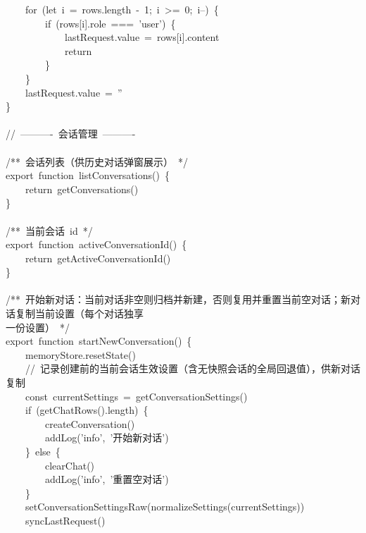 \documentclass[a4paper,10pt]{article}
\begin{document}
{\ttfamily\footnotesize\raggedright
~~~~for~(let~i~=~rows.length~-~1;~i~>=~0;~i--)~\{\\
~~~~~~~~if~(rows[i].role~===~'user')~\{\\
~~~~~~~~~~~~lastRequest.value~=~rows[i].content\\
~~~~~~~~~~~~return\\
~~~~~~~~\}\\
~~~~\}\\
~~~~lastRequest.value~=~''\\
\}\\
\mbox{}\\
//~----------~会话管理~----------\\
\mbox{}\\
/**~会话列表（供历史对话弹窗展示）~*/\\
export~function~listConversations()~\{\\
~~~~return~getConversations()\\
\}\\
\mbox{}\\
/**~当前会话~id~*/\\
export~function~activeConversationId()~\{\\
~~~~return~getActiveConversationId()\\
\}\\
\mbox{}\\
/**~开始新对话：当前对话非空则归档并新建，否则复用并重置当前空对话；新对话复制当前设置（每个对话独享\\
一份设置）~*/\\
export~function~startNewConversation()~\{\\
~~~~memoryStore.resetState()\\
~~~~//~记录创建前的当前会话生效设置（含无快照会话的全局回退值），供新对话复制\\
~~~~const~currentSettings~=~getConversationSettings()\\
~~~~if~(getChatRows().length)~\{\\
~~~~~~~~createConversation()\\
~~~~~~~~addLog('info',~'开始新对话')\\
~~~~\}~else~\{\\
~~~~~~~~clearChat()\\
~~~~~~~~addLog('info',~'重置空对话')\\
~~~~\}\\
~~~~setConversationSettingsRaw(normalizeSettings(currentSettings))\\
~~~~syncLastRequest()\\
}
\end{document}
